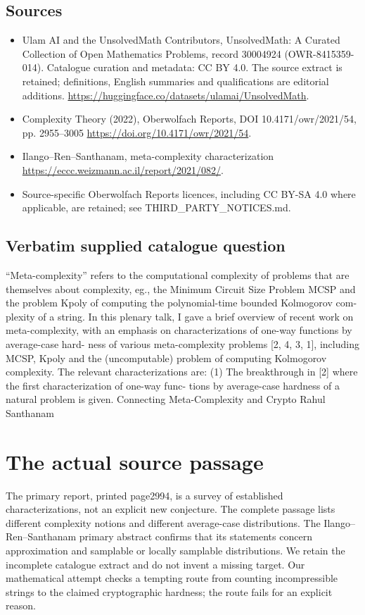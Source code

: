 \documentclass[11pt]{article}
\begin{document}
\subsection{Sources}
\begin{itemize}
\item[S1] Ulam AI and the UnsolvedMath Contributors, UnsolvedMath: A Curated Collection of Open Mathematics Problems, record 30004924 (OWR-8415359-014). Catalogue curation and metadata: CC BY 4.0. The source extract is retained; definitions, English summaries and qualifications are editorial additions.
\url{https://huggingface.co/datasets/ulamai/UnsolvedMath}.
\item[S2] Complexity Theory (2022), Oberwolfach Reports, DOI 10.4171/owr/2021/54, pp. 2955--3005
\url{https://doi.org/10.4171/owr/2021/54}.
\item[S3] Ilango--Ren--Santhanam, meta-complexity characterization
\url{https://eccc.weizmann.ac.il/report/2021/082/}.
\item Source-specific Oberwolfach Reports licences, including CC BY-SA 4.0 where applicable, are retained; see THIRD\_PARTY\_NOTICES.md.
\end{itemize}
\subsection{Verbatim supplied catalogue question}
“Meta-complexity” refers to the computational complexity of problems that are themselves about complexity, eg., the Minimum Circuit Size Problem MCSP and the problem Kpoly of computing the polynomial-time bounded Kolmogorov com- plexity of a string. In this plenary talk, I gave a brief overview of recent work on meta-complexity, with an emphasis on characterizations of one-way functions by average-case hard- ness of various meta-complexity problems [2, 4, 3, 1], including MCSP, Kpoly and the (uncomputable) problem of computing Kolmogorov complexity. The relevant characterizations are: (1) The breakthrough in [2] where the first characterization of one-way func- tions by average-case hardness of a natural problem is given. Connecting Meta-Complexity and Crypto Rahul Santhanam

\section{The actual source passage}
The primary report, printed page2994, is a survey of established
characterizations, not an explicit new conjecture. The complete
passage lists different complexity notions and different
average-case distributions. The Ilango--Ren--Santhanam primary
abstract confirms that its statements concern approximation and
samplable or locally samplable distributions. We retain the
incomplete catalogue extract and do not invent a missing target.
Our mathematical attempt checks a tempting route from counting
incompressible strings to the claimed cryptographic hardness;
the route fails for an explicit reason.
\end{document}
